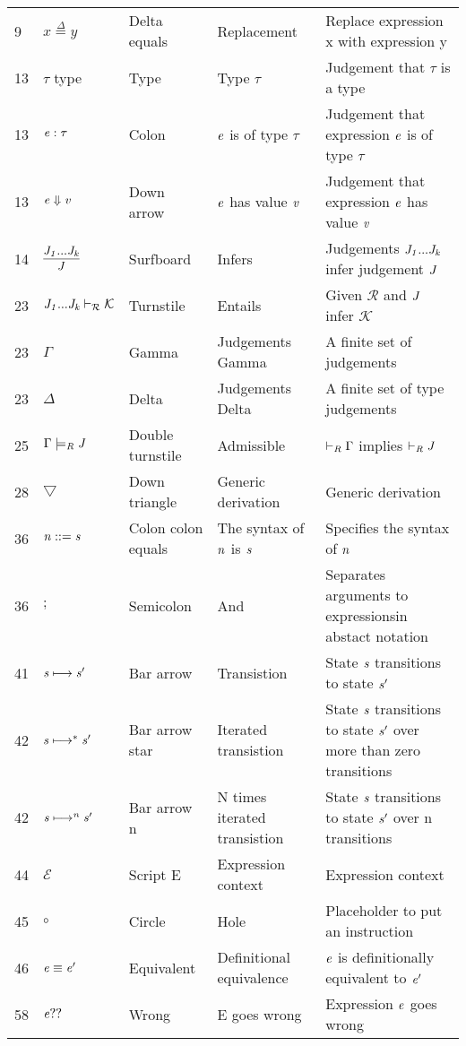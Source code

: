 \documentclass[12pt]{article}
\begin{document}
\begin{tabular}[b] {p{} p{} p{} p{} p{}}
9& $x \overset{\Delta}{=} y$ & Delta equals & Replacement & Replace expression x with expression y \\
13& $\tau$ type& Type & Type $\tau$ & Judgement that $\tau$ is a type \\
13& $\it{e} : \tau$ & Colon &  $\it{e}$ is of type $\tau$ & Judgement that expression $\it{e}$ is of type $\tau$ \\
13& $\it{e} \Downarrow \it{v}$ & Down arrow &  $\it{e}$ has value $\it{v} $ & Judgement that expression $\it{e}$ has value $\it{v} $\\
14& $\infer {\it{J}} {\it{J}_{1}...\it{J}_{\it{k}}}$  & Surfboard & Infers & Judgements ${\it{J}_{1}...\it{J}_{\it{k}}}$ infer judgement ${\it{J}}$\\
23 & ${\it{J}_{1}...\it{J}_{\it{k}}} \vdash_{\mathcal{R}} \mathcal{K}$ & Turnstile & Entails & Given $\mathcal{R}$ and $\it{J}$ infer $\mathcal{K}$\\
23 & $\Gamma$ & Gamma & Judgements Gamma & A finite set of judgements \\
23 & $\Delta$ & Delta & Judgements Delta & A finite set of type judgements \\
25 & $\Gamma \models_{\it{R}} \it{J}$ & Double turnstile & Admissible & $\vdash_{\it{R}} \Gamma$ implies $\vdash_{\it{R}} \it{J}$ \\
28 & $\bigtriangledown$ & Down triangle & Generic derivation & Generic derivation \\
36 & $ \it{n} ::= \it{s} $ & Colon colon equals & The syntax of $\it{n}$ is $\it{s}$ & Specifies the syntax of $\it{n}$ \\
36 & $;$ & Semicolon & And & Separates arguments to expressionsin abstact notation\\

41 & $\it{s} \longmapsto \it{s'}$ & Bar arrow & Transistion  & State $\it{s}$ transitions to state $\it{s'}$ \\

42 & $\it{s} \longmapsto ^{*} \it{s'}$ & Bar arrow star & Iterated transistion  & State $\it{s}$ transitions to state $\it{s'}$ over more than zero transitions \\

42 & $\it{s} \longmapsto ^{n} \it{s'}$ & Bar arrow n & N times iterated transistion  & State $\it{s}$ transitions to state $\it{s'}$ over n transitions \\

44 & $\mathcal{E}$  & Script E & Expression context & Expression context \\

45 & $\circ $ & Circle & Hole & Placeholder to put an instruction \\
46 & $ \it{e} \equiv \it{e}' $ & Equivalent & Definitional equivalence & $\it{e}$ is definitionally equivalent to $\it{e}'$ \\

58 & $\it{e}??$ & Wrong & E goes wrong & Expression $\it{e}$ goes wrong \\

\end{tabular}
\newpage
\end{document}
